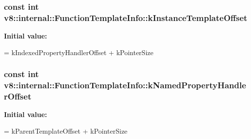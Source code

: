 \subsubsection[{\texorpdfstring{k\+Instance\+Template\+Offset}{kInstanceTemplateOffset}}]{\setlength{\rightskip}{0pt plus 5cm}const int v8\+::internal\+::\+Function\+Template\+Info\+::k\+Instance\+Template\+Offset\hspace{0.3cm}{\ttfamily [static]}}\hypertarget{classv8_1_1internal_1_1_function_template_info_a718d431c763bdeb6f9296f565917bcd5}{}\label{classv8_1_1internal_1_1_function_template_info_a718d431c763bdeb6f9296f565917bcd5}
{\bfseries Initial value\+:}
\begin{DoxyCode}
=
      kIndexedPropertyHandlerOffset + kPointerSize
\end{DoxyCode}
\subsubsection[{\texorpdfstring{k\+Named\+Property\+Handler\+Offset}{kNamedPropertyHandlerOffset}}]{\setlength{\rightskip}{0pt plus 5cm}const int v8\+::internal\+::\+Function\+Template\+Info\+::k\+Named\+Property\+Handler\+Offset\hspace{0.3cm}{\ttfamily [static]}}\hypertarget{classv8_1_1internal_1_1_function_template_info_a80ab9a5f2c7652897ef9e13c41e8abc3}{}\label{classv8_1_1internal_1_1_function_template_info_a80ab9a5f2c7652897ef9e13c41e8abc3}
{\bfseries Initial value\+:}
\begin{DoxyCode}
=
      kParentTemplateOffset + kPointerSize
\end{DoxyCode}
